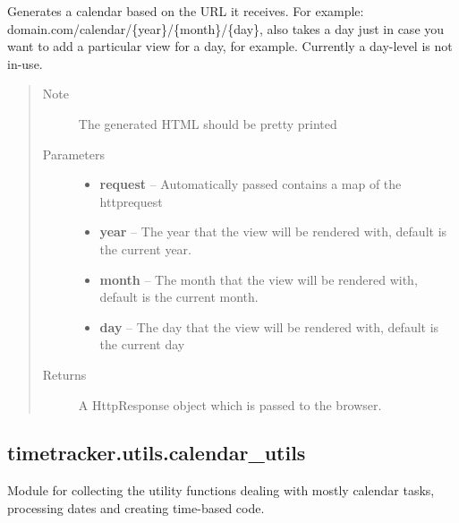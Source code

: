 \documentclass[letterpaper,10pt,english]{sphinxmanual}
\begin{document}

\begin{fulllineitems}
\label{timetracker:timetracker.views.user_view}
Generates a calendar based on the URL it receives.
For example: domain.com/calendar/\{year\}/\{month\}/\{day\},
also takes a day just in case you want to add a particular
view for a day, for example. Currently a day-level is not
in-use.
\begin{quote}\begin{description}
\item[{Note }] \leavevmode
The generated HTML should be pretty printed

\item[{Parameters}] \leavevmode\begin{itemize}
\item {} 
\textbf{request} -- Automatically passed contains a map of the httprequest

\item {} 
\textbf{year} -- The year that the view will be rendered with, default is
the current year.

\item {} 
\textbf{month} -- The month that the view will be rendered with, default is
the current month.

\item {} 
\textbf{day} -- The day that the view will be rendered with, default is
the current day

\end{itemize}

\item[{Returns}] \leavevmode
A HttpResponse object which is passed to the browser.

\end{description}\end{quote}

\end{fulllineitems}



\subsection{timetracker.utils.calendar\_utils}
\label{timetracker:timetracker-utils-calendar-utils}\label{timetracker:module-timetracker.utils.calendar_utils}
Module for collecting the utility functions dealing with mostly calendar
tasks, processing dates and creating time-based code.
\end{document}
